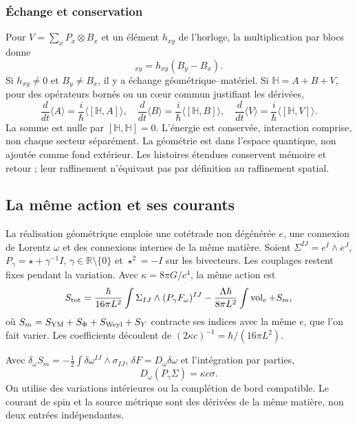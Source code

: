 \subsubsection{Échange et conservation}
\label{hmtcuatro:gea:intercambio}

Pour $V=\sum_xP_x\otimes B_x$ et un élément $h_{xy}$ de l’horloge, la multiplication par blocs donne
\begin{equation}
[H_{\rm clk}\otimes I,V]_{xy}=h_{xy}(B_y-B_x).
\label{hmtcuatro:gea:conmutador}
\end{equation}
Si $h_{xy}\ne0$ et $B_y\ne B_x$, il y a échange géométrique--matériel. Si $\mathbb H=A+B+V$, pour des opérateurs bornés ou un cœur commun justifiant les dérivées,
\[
\frac d{dt}\langle A\rangle=\frac i\hbar\langle[\mathbb H,A]\rangle,
\quad
\frac d{dt}\langle B\rangle=\frac i\hbar\langle[\mathbb H,B]\rangle,
\quad
\frac d{dt}\langle V\rangle=\frac i\hbar\langle[\mathbb H,V]\rangle.
\]
La somme est nulle par $[\mathbb H,\mathbb H]=0$. L’énergie est conservée, interaction comprise, non chaque secteur séparément. La géométrie est dans l’espace quantique, non ajoutée comme fond extérieur. Les histoires étendues conservent mémoire et retour ; leur raffinement n’équivaut pas par définition au raffinement spatial.

\subsection{La même action et ses courants}
\label{hmtcuatro:gea:accion}

La réalisation géométrique emploie une cotétrade non dégénérée $e$, une connexion de Lorentz $\omega$ et des connexions internes de la même matière. Soient $\Sigma^{IJ}=e^I\wedge e^J$, $P_\gamma=\star+\gamma^{-1}I$, $\gamma\in\mathbb R\setminus\{0\}$ et $\star^2=-I$ sur les bivecteurs. Les couplages restent fixes pendant la variation. Avec $\kappa=8\pi G/c^4$, la même action est
\begin{equation}
S_{\rm tot}=\frac{\hbar}{16\pi L^2}
\int\Sigma_{IJ}\wedge(P_\gamma F_\omega)^{IJ}
-\frac{\Lambda\hbar}{8\pi L^2}\int\operatorname{vol}_e+S_m,
\label{hmtcuatro:gea:accion-total}
\end{equation}
où $S_m=S_{\rm YM}+S_\Phi+S_{\rm Weyl}+S_Y$ contracte ses indices avec la même $e$, que l’on fait varier. Les coefficients découlent de $(2\kappa c)^{-1}=\hbar/(16\pi L^2)$.

Avec $\delta_\omega S_m=-\tfrac12\int
\delta\omega^{IJ}\wedge\sigma_{IJ}$, $\delta F=D_\omega\delta\omega$ et l’intégration par parties,
\begin{equation}
D_\omega(P_\gamma\Sigma)=\kappa c\sigma.
\label{hmtcuatro:gea:cartan}
\end{equation}
On utilise des variations intérieures ou la complétion de bord compatible. Le courant de spin et la source métrique sont des dérivées de la même matière, non deux entrées indépendantes.

